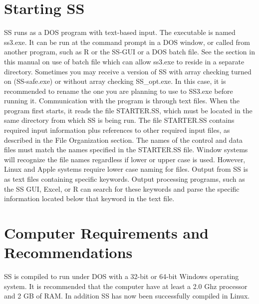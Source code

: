 \section{Starting SS}
SS runs as a DOS program with text-based input.  The executable is named ss3.exe.  It can be run at the command prompt in a DOS window, or called from another program, such as R or the SS-GUI or a DOS batch file.  See the section in this manual on use of batch file which can allow ss3.exe to reside in a separate directory.  Sometimes you may receive a version of SS with array checking turned on (SS-safe.exe) or without array checking SS\_opt.exe.  In this case, it is recommended to rename the one you are planning to use to SS3.exe before running it.  Communication with the program is through text files.  When the program first starts, it reads the file STARTER.SS, which must be located in the same directory from which SS is being run.  The file STARTER.SS contains required input information plus references to other required input files, as described in the File Organization section.  The names of the control and data files must match the names specified in the STARTER.SS file.  Window systems will recognize the file names regardless if lower or upper case is used.  However, Linux and Apple systems require lower case naming for files. Output from SS is as text files containing specific keywords.  Output processing programs, such as the SS GUI, Excel, or R can search for these keywords and parse the specific information located below that keyword in the text file.


\section{Computer Requirements and Recommendations}
SS is compiled to run under DOS with a 32-bit or 64-bit Windows operating system.  It is recommended that the computer have at least a 2.0 Ghz processor and 2 GB of RAM.  In addition SS has now been successfully compiled in Linux.